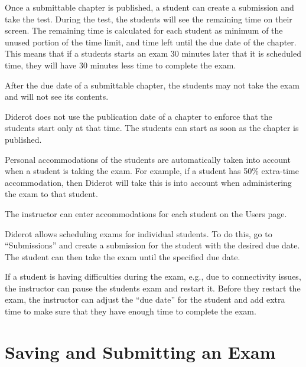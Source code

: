 \begin{gram}
Once a submittable chapter is published, a student can create a submission and take the test.  During the test, the students will see the remaining time on their screen.  The remaining time is calculated for each student as minimum of the unused portion of the time limit, and time left until the due date of the chapter.  This means that if a students starts an exam 30 minutes later that it is scheduled time, they will have 30 minutes less time to complete the exam.

After the due date of a submittable chapter, the students may not take the exam and will not see its contents.

Diderot does not use the publication date of a chapter to enforce that the students start only at that time.  The students can start as soon as the chapter is published.
\end{gram}


\begin{gram}[Accommodations]
Personal accommodations of the students are automatically taken into account when a student is taking the exam.  For example, if a student has 50\% extra-time accommodation, then Diderot will take this is into account when administering the exam to that student.  

The instructor can enter accommodations for each student on the Users page. 
\end{gram}

\begin{gram}
Diderot allows scheduling exams for individual students.  To do this, go to ``Submissions'' and create a submission for the student with the desired due date.  The student can then take the exam until the specified due date.
\end{gram}


\begin{gram}

If a student is having difficulties during the exam, e.g., due to connectivity issues, the instructor can pause the students exam and restart it.  Before they restart the exam, the instructor can adjust the ``due date'' for the student and add extra time to make sure that they have enough time to complete the exam. 

\end{gram}

\section{Saving and Submitting an Exam}
\label{ch:quiz::submit}

